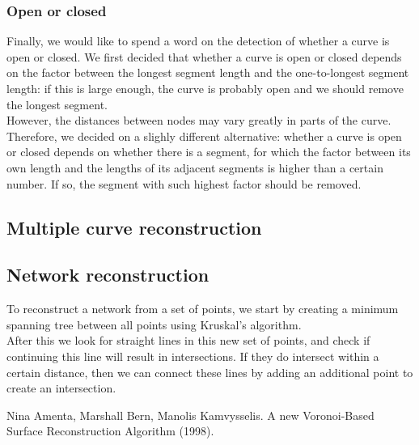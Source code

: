 \documentclass[11pt]{article}
\begin{document}
\subsubsection{Open or closed} 

Finally, we would like to spend a word on the detection of whether a curve is open or closed. We first decided that whether a curve is open or closed depends on the factor between the longest segment length and the one-to-longest segment length: if this is large enough, the curve is probably open and we should remove the longest segment.\\

However, the distances between nodes may vary greatly in parts of the curve. Therefore, we decided on a slighly different alternative: whether a curve is open or closed depends on whether there is a segment, for which the factor between its own length and the lengths of its adjacent segments is higher than a certain number. If so, the segment with such highest factor should be removed.\\

\subsection*{Multiple curve reconstruction}

\subsection*{Network reconstruction}
To reconstruct a network from a set of points, we start by creating a minimum spanning tree between all points using Kruskal's algorithm.\\
After this we look for straight lines in this new set of points, and check if continuing this line will result in intersections. If they do intersect within a certain distance, then we can connect these lines by adding an additional point to create an intersection.\\



\begin{thebibliography}{50}

Nina Amenta, Marshall Bern, Manolis Kamvysselis.
A new Voronoi-Based Surface Reconstruction Algorithm
(1998).

\end{thebibliography}
\end{document}
